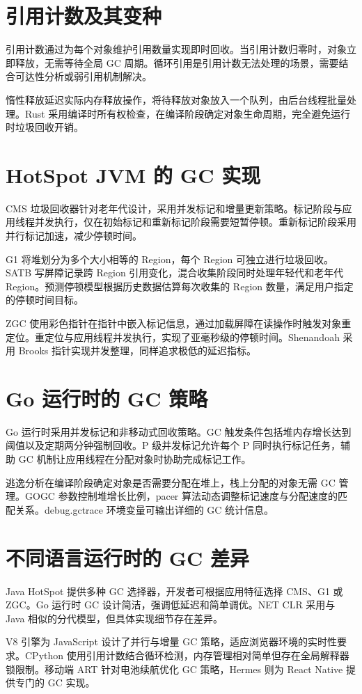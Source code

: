 \chapter{引用计数及其变种}
引用计数通过为每个对象维护引用数量实现即时回收。当引用计数归零时，对象立即释放，无需等待全局 GC 周期。循环引用是引用计数无法处理的场景，需要结合可达性分析或弱引用机制解决。\par
惰性释放延迟实际内存释放操作，将待释放对象放入一个队列，由后台线程批量处理。Rust 采用编译时所有权检查，在编译阶段确定对象生命周期，完全避免运行时垃圾回收开销。\par
\chapter{HotSpot JVM 的 GC 实现}
CMS 垃圾回收器针对老年代设计，采用并发标记和增量更新策略。标记阶段与应用线程并发执行，仅在初始标记和重新标记阶段需要短暂停顿。重新标记阶段采用并行标记加速，减少停顿时间。\par
G1 将堆划分为多个大小相等的 Region，每个 Region 可独立进行垃圾回收。SATB 写屏障记录跨 Region 引用变化，混合收集阶段同时处理年轻代和老年代 Region。预测停顿模型根据历史数据估算每次收集的 Region 数量，满足用户指定的停顿时间目标。\par
ZGC 使用彩色指针在指针中嵌入标记信息，通过加载屏障在读操作时触发对象重定位。重定位与应用线程并发执行，实现了亚毫秒级的停顿时间。Shenandoah 采用 Brooks 指针实现并发整理，同样追求极低的延迟指标。\par
\chapter{Go 运行时的 GC 策略}
Go 运行时采用并发标记和非移动式回收策略。GC 触发条件包括堆内存增长达到阈值以及定期两分钟强制回收。P 级并发标记允许每个 P 同时执行标记任务，辅助 GC 机制让应用线程在分配对象时协助完成标记工作。\par
逃逸分析在编译阶段确定对象是否需要分配在堆上，栈上分配的对象无需 GC 管理。GOGC 参数控制堆增长比例，pacer 算法动态调整标记速度与分配速度的匹配关系。debug.gctrace 环境变量可输出详细的 GC 统计信息。\par
\chapter{不同语言运行时的 GC 差异}
Java HotSpot 提供多种 GC 选择器，开发者可根据应用特征选择 CMS、G1 或 ZGC。Go 运行时 GC 设计简洁，强调低延迟和简单调优。NET CLR 采用与 Java 相似的分代模型，但具体实现细节存在差异。\par
V8 引擎为 JavaScript 设计了并行与增量 GC 策略，适应浏览器环境的实时性要求。CPython 使用引用计数结合循环检测，内存管理相对简单但存在全局解释器锁限制。移动端 ART 针对电池续航优化 GC 策略，Hermes 则为 React Native 提供专门的 GC 实现。\par
